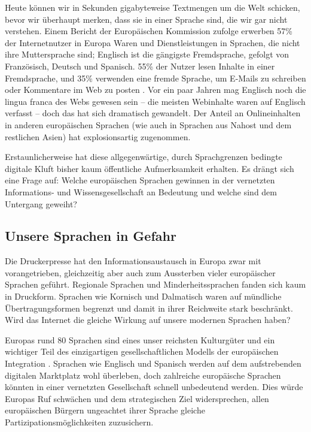 \begin{multicols}{2}
Heute können wir in Sekunden gigabyteweise Textmengen um die Welt schicken, bevor wir überhaupt merken, dass sie in einer Sprache sind, die wir gar nicht verstehen. Einem Bericht der Europäischen Kommission zufolge erwerben 57\% der Internetnutzer in Europa Waren und Dienstleistungen in Sprachen, die nicht ihre Muttersprache sind; Englisch ist die gängigste Fremdsprache, gefolgt von Französisch, Deutsch und Spanisch. 55\% der Nutzer lesen Inhalte in einer Fremdsprache, und 35\% verwenden eine fremde Sprache, um E-Mails zu schreiben oder Kommentare im Web zu posten \cite{EC1}. Vor ein paar Jahren mag Englisch noch die lingua franca des Webs gewesen sein -- die meisten Webinhalte waren auf Englisch verfasst -- doch das hat sich dramatisch gewandelt. Der Anteil an Onlineinhalten in anderen europäischen Sprachen (wie auch in Sprachen aus Nahost und dem restlichen Asien) hat explosionsartig zugenommen. 

Erstaunlicherweise hat diese allgegenwärtige, durch Sprachgrenzen bedingte digitale Kluft bisher kaum öffentliche Aufmerksamkeit erhalten. Es drängt sich eine Frage auf: Welche europäischen Sprachen gewinnen in der vernetzten Informations- und Wissensgesellschaft an Bedeutung und welche sind dem Untergang geweiht?

\subsection{Unsere Sprachen in Gefahr}

Die Druckerpresse hat den Informationsaustausch in Europa zwar mit vorangetrieben, gleichzeitig aber auch zum Aussterben vieler europäischer Sprachen geführt. Regionale Sprachen und Minderheitssprachen fanden sich kaum in Druckform. Sprachen wie Kornisch und Dalmatisch waren auf mündliche Übertragungsformen begrenzt und damit in ihrer Reichweite stark beschränkt. Wird das Internet die gleiche Wirkung auf unsere modernen Sprachen haben?


Europas rund 80 Sprachen sind eines unser reichsten Kulturgüter und ein wichtiger Teil des einzigartigen gesellschaftlichen Modells der europäischen Integration \cite{EC2}. Sprachen wie Englisch und Spanisch werden auf dem aufstrebenden digitalen Marktplatz wohl überleben, doch zahlreiche europäische Sprachen könnten in einer vernetzten Gesellschaft schnell unbedeutend werden. Dies würde Europas Ruf schwächen und dem strategischen Ziel widersprechen, allen europäischen Bürgern ungeachtet ihrer Sprache gleiche Partizipationsmöglichkeiten zuzusichern.


\end{multicols}

